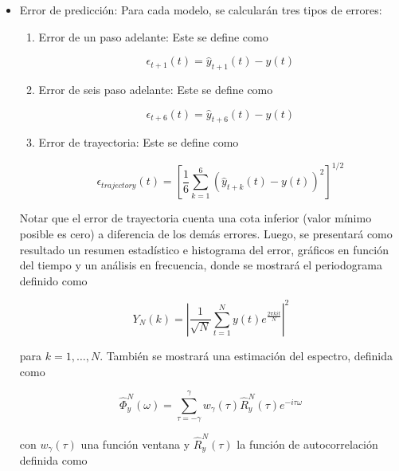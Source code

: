 \begin{itemize}

\item Error de predicción: Para cada modelo, se calcularán tres tipos de errores:

\begin{enumerate}
	\item Error de un paso adelante: Este se define como
	
	\begin{equation}
		\epsilon_{t+1} (t) = \hat{y}_{t+1}(t) - y(t)
	\end{equation}
	
	\item Error de seis paso adelante: Este se define como
	
	\begin{equation}
	\epsilon_{t+6} (t) = \hat{y}_{t+6}(t) - y(t)
	\end{equation}
	
	\item Error de trayectoria: Este se define como
	
	\begin{equation}
	\epsilon_{trajectory} (t) = 
	\left[
	\frac{1}{6}
	\sum_{k=1}^{6}
	\left(\hat{y}_{t+k}(t) - y(t)\right)^2
	\right]^{1/2}
	\end{equation}
	
\end{enumerate}

Notar que el error de trayectoria cuenta una cota inferior (valor mínimo posible es cero) a diferencia de los demás errores. Luego, se presentará como resultado un resumen estadístico e histograma del error, gráficos en función del tiempo y un análisis en frecuencia, donde se mostrará el periodograma definido como

\begin{equation}
	Y_N(k) = \left| \frac{1}{\sqrt{N}} \sum_{t=1}^{N} y(t) e^{\frac{2\pi ki t}{N}} \right|^2
\end{equation}

para $k = 1,\dots, N$. También se mostrará una estimación del espectro, definida como

\begin{equation}
	\hat{\Phi}_y^N(\omega) = \sum_{\tau=-\gamma}^{\gamma} w_\gamma(\tau) \hat{R}_y^N(\tau) e^{-i\tau \omega}
\end{equation}

con $w_\gamma(\tau)$ una función ventana y $\hat{R}_y^N(\tau)$ la función de autocorrelación definida como


\end{itemize}
